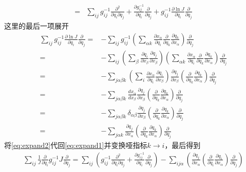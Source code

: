 \begin{note}
\begin{equation}
\begin{aligned}
    =& \sum_{ij}{g}^{-1}_{ij} \frac{\partial^2}{\partial q_{i}\partial q_{j}} + \frac{\partial {g}^{-1}_{ij}}{\partial q_{i}} \frac{\partial}{\partial q_{j}} + {g}^{-1}_{ij}\frac{\partial \ln{J}}{\partial q_{i}} \frac{\partial}{\partial q_{j}}
    \label{eq:expand1}
\end{aligned}\end{equation}
这里的最后一项展开
\begin{equation}\begin{aligned}
    \sum_{ij}{g}^{-1}_{ij}\frac{\partial \ln{J}}{\partial q_{i}} \frac{\partial}{\partial q_{j}} =& -\sum_{ij} {g}^{-1}_{ij} \left(\sum_{\alpha k}\frac{\partial x_{\alpha}}{\partial q_{i}} \frac{\partial}{\partial q_{k}} \frac{\partial q_{k}}{\partial x_{\alpha}}\right) \frac{\partial}{\partial q_{j}} \\
    =& -\sum_{ij}\left(\sum_{\beta}\frac{\partial q_{i}}{\partial x_{\beta}} \frac{\partial q_{j}}{\partial x_{\beta}}\right) \left(\sum_{\alpha k}\frac{\partial x_{\alpha}}{\partial q_{i}} \frac{\partial}{\partial q_{k}} \frac{\partial q_{k}}{\partial x_{\alpha}}\right) \frac{\partial}{\partial q_{j}} \\
    =& -\sum_{j\alpha\beta k}\left(\sum_{i}\frac{\partial x_{\alpha}}{\partial q_{i}}\frac{\partial q_{i}}{\partial x_{\beta}}\right)  \frac{\partial q_{j}}{\partial x_{\beta}} \left(\frac{\partial}{\partial q_{k}} \frac{\partial q_{k}}{\partial x_{\alpha}}\right) \frac{\partial}{\partial q_{j}} \\
    =& -\sum_{j\alpha\beta k} \frac{d x_{\alpha}}{d x_{\beta}} \frac{\partial q_{j}}{\partial x_{\beta}} \left(\frac{\partial}{\partial q_{k}} \frac{\partial q_{k}}{\partial x_{\alpha}}\right) \frac{\partial}{\partial q_{j}} \\
    =& -\sum_{j\alpha\beta k} \delta_{\alpha\beta} \frac{\partial q_{j}}{\partial x_{\beta}} \left(\frac{\partial}{\partial q_{k}} \frac{\partial q_{k}}{\partial x_{\alpha}}\right) \frac{\partial}{\partial q_{j}} \\
    =& -\sum_{j\alpha k} \frac{\partial q_{j}}{\partial x_{\alpha}} \left(\frac{\partial}{\partial q_{k}} \frac{\partial q_{k}}{\partial x_{\alpha}}\right) \frac{\partial}{\partial q_{j}}
    \label{eq:expand2}
\end{aligned}\end{equation}
将\cref{eq:expand2}代回\cref{eq:expand1}并变换哑指标$k\rightarrow i$，最后得到
\begin{equation}\begin{aligned}
    \sum_{ij}\frac{1}{J} \frac{\partial}{\partial q_{i}}{g}^{-1}_{ij} J \frac{\partial}{\partial q_j} = \sum_{ij}\left({g}^{-1}_{ij} \frac{\partial^2}{\partial q_{i}\partial q_{j}} + \frac{\partial {g}^{-1}_{ij}}{\partial q_{i}} \frac{\partial}{\partial q_{j}} \right) - \sum_{ij\alpha}\left(\frac{\partial q_{j}}{\partial x_{\alpha}} \left(\frac{\partial}{\partial q_{i}} \frac{\partial q_{i}}{\partial x_{\alpha}}\right) \frac{\partial}{\partial q_{j}}\right)

\end{aligned}
\end{equation}
\end{note}
